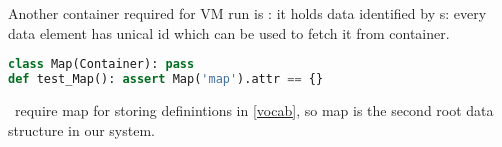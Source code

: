 \clearpage{}

\noindent Another container required for VM run is : it holds data
identified by s: every data element has unical id which can be used to
fetch it from container.

\begin{lstlisting}[language=Python]
class Map(Container): pass
def test_Map(): assert Map('map').attr == {}
\end{lstlisting}

\noindent
\F\ require map for storing definintions in  \ref{vocab}, so
map is the second root data structure in our system.
